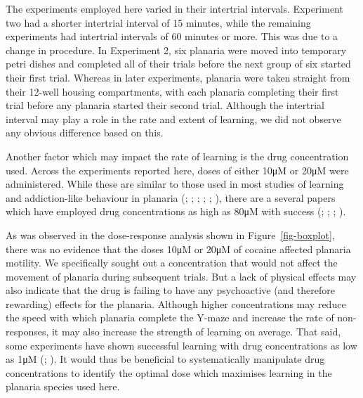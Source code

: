 \documentclass[
  jou,
  floatsintext,
  longtable,
  nolmodern,
  notxfonts,
  notimes,
  donotrepeattitle,
  colorlinks=true,linkcolor=blue,citecolor=blue,urlcolor=blue]{apa7}
\begin{document}
The experiments employed here varied in their intertrial intervals.
Experiment two had a shorter intertrial interval of 15 minutes, while
the remaining experiments had intertrial intervals of 60 minutes or
more. This was due to a change in procedure. In Experiment 2, six
planaria were moved into temporary petri dishes and completed all of
their trials before the next group of six started their first trial.
Whereas in later experiments, planaria were taken straight from their
12-well housing compartments, with each planaria completing their first
trial before any planaria started their second trial. Although the
intertrial interval may play a role in the rate and extent of learning,
we did not observe any obvious difference based on this.

Another factor which may impact the rate of learning is the drug
concentration used. Across the experiments reported here, doses of
either 10μM or 20μM were administered. While these are similar to those
used in most studies of learning and addiction-like behaviour in
planaria (; ; ; ;
;
), there are a several
papers which have employed drug concentrations as high as 80μM with
success (;
;
;
).

As was observed in the dose-response analysis shown in
Figure~\ref{fig-boxplot}, there was no evidence that the doses 10μM or
20μM of cocaine affected planaria motility. We specifically sought out a
concentration that would not affect the movement of planaria during
subsequent trials. But a lack of physical effects may also indicate that
the drug is failing to have any psychoactive (and therefore rewarding)
effects for the planaria. Although higher concentrations may reduce the
speed with which planaria complete the Y-maze and increase the rate of
non-responses, it may also increase the strength of learning on average.
That said, some experiments have shown successful learning with drug
concentrations as low as 1μM
(;
). It would
thus be beneficial to systematically manipulate drug concentrations to
identify the optimal dose which maximises learning in the planaria
species used here.
\end{document}
